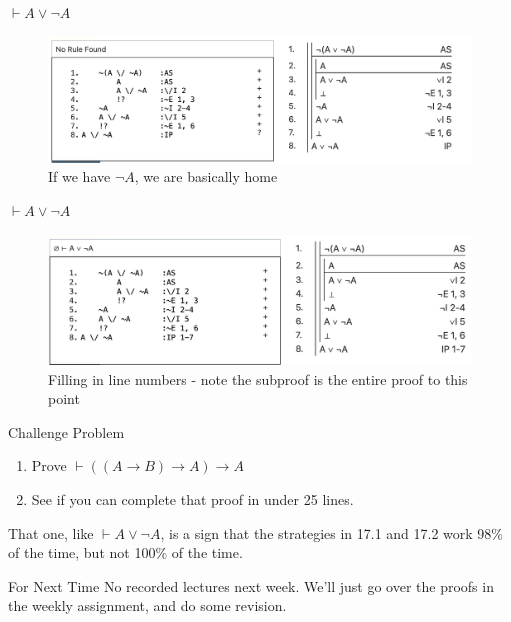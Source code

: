 \documentclass[
  ignorenonframetext,
]{beamer}
\providecommand{\tightlist}{%
  \setlength{\itemsep}{0pt}\setlength{\parskip}{0pt}}
\renewcommand{\,}{\text{, }}
\begin{document}
\begin{frame}{\(\vdash A \vee \neg A\)}
\protect\hypertarget{vdash-a-vee-neg-a-3}{}
\begin{figure}
\centering
\includegraphics[width=\textwidth,height=0.75\textheight]{5_6s.png}
\caption{If we have \(\neg A\), we are basically home}
\end{figure}
\end{frame}

\begin{frame}{\(\vdash A \vee \neg A\)}
\protect\hypertarget{vdash-a-vee-neg-a-4}{}
\begin{figure}
\centering
\includegraphics[width=\textwidth,height=0.75\textheight]{5_6t.png}
\caption{Filling in line numbers - note the subproof is the entire proof
to this point}
\end{figure}
\end{frame}

\begin{frame}{Challenge Problem}
\protect\hypertarget{challenge-problem}{}
\begin{enumerate}
\tightlist
\item
  Prove \(\vdash ((A \rightarrow B) \rightarrow A) \rightarrow A\)
\item
  See if you can complete that proof in under 25 lines.
\end{enumerate}

That one, like \(\vdash A \vee \neg A\), is a sign that the strategies
in 17.1 and 17.2 work 98\% of the time, but not 100\% of the time.
\end{frame}

\begin{frame}{For Next Time}
\protect\hypertarget{for-next-time}{}
No recorded lectures next week. We'll just go over the proofs in the
weekly assignment, and do some revision.
\end{frame}
\end{document}
